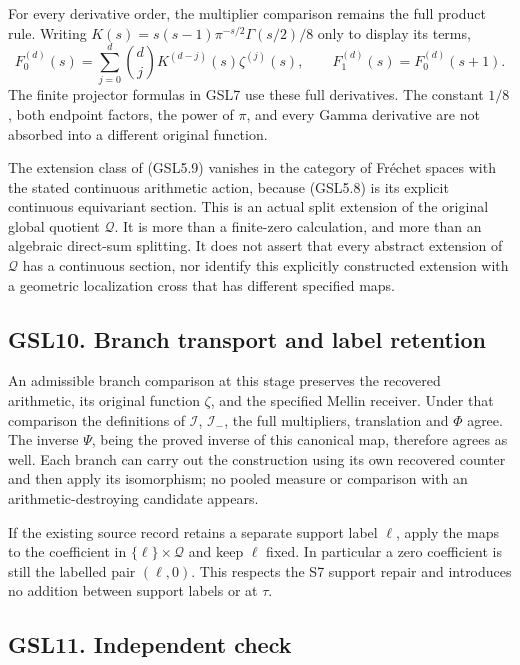 For every derivative order, the multiplier comparison remains the full
product rule. Writing \(K(s)=s(s-1)\pi^{-s/2}\Gamma(s/2)/8\) only to
display its terms, \[
F_0^{(d)}(s)=\sum_{j=0}^d\binom dj K^{(d-j)}(s)\zeta^{(j)}(s),
\qquad F_1^{(d)}(s)=F_0^{(d)}(s+1).
\tag{GSL9.2}
\] The finite projector formulas in GSL7 use these full derivatives. The
constant \(1/8\), both endpoint factors, the power of \(\pi\), and every
Gamma derivative are not absorbed into a different original function.

The extension class of (GSL5.9) vanishes in the category of Fréchet
spaces with the stated continuous arithmetic action, because (GSL5.8) is
its explicit continuous equivariant section. This is an actual split
extension of the original global quotient \(\mathcal Q\). It is more
than a finite-zero calculation, and more than an algebraic direct-sum
splitting. It does not assert that every abstract extension of
\(\mathcal Q\) has a continuous section, nor identify this explicitly
constructed extension with a geometric localization cross that has
different specified maps.

\subsection{GSL10. Branch transport and label
retention}\label{gsl10.-branch-transport-and-label-retention}

An admissible branch comparison at this stage preserves the recovered
arithmetic, its original function \(\zeta\), and the specified Mellin
receiver. Under that comparison the definitions of \(\mathcal I\),
\(\mathcal I_-\), the full multipliers, translation and \(\Phi\) agree.
The inverse \(\Psi\), being the proved inverse of this canonical map,
therefore agrees as well. Each branch can carry out the construction
using its own recovered counter and then apply its isomorphism; no
pooled measure or comparison with an arithmetic-destroying candidate
appears.

If the existing source record retains a separate support label \(\ell\),
apply the maps to the coefficient in \(\{\ell\}\times\mathcal Q\) and
keep \(\ell\) fixed. In particular a zero coefficient is still the
labelled pair \((\ell,0)\). This respects the S7 support repair and
introduces no addition between support labels or at \(\tau\).

\subsection{GSL11. Independent check}\label{gsl11.-independent-check}

